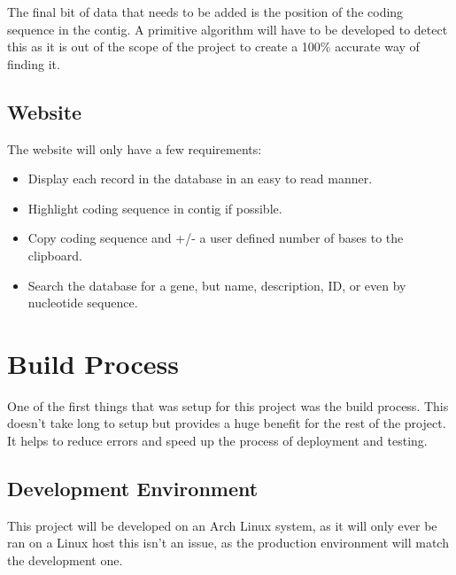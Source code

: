 The final bit of data that needs to be added is the position of the coding sequence in the contig. A primitive algorithm will have to be developed to detect this as it is out of the scope of the project to create a 100\% accurate way of finding it.

%

\subsection{Website}
The website will only have a few requirements: 

\begin{itemize}
  \item Display each record in the database in an easy to read manner. 
  \item Highlight coding sequence in contig if possible.
  \item Copy coding sequence and +/- a user defined number of bases to the clipboard.
  \item Search the database for a gene, but name, description, ID, or even by nucleotide sequence. 
\end{itemize}


\section{Build Process}
  One of the first things that was setup for this project was the build process. This doesn't take long to setup but provides a huge benefit for the rest of the project. It helps to reduce errors and speed up the process of deployment and testing.

  \subsection{Development Environment}
    This project will be developed on an Arch Linux system, as it will only ever be ran on a Linux host this isn't an issue, as the production environment will match the development one. 


